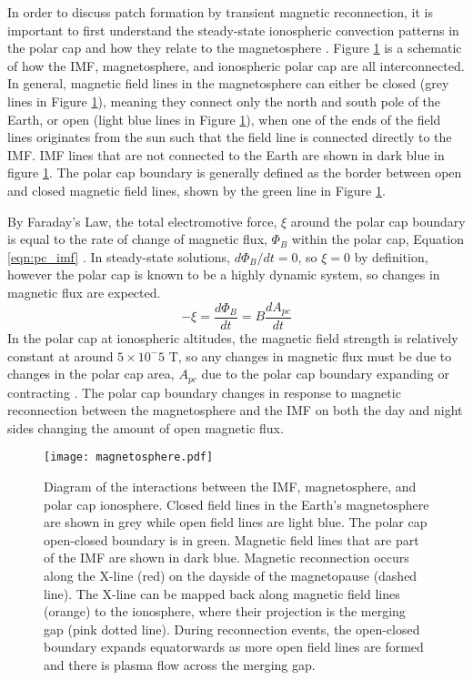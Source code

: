 In order to discuss patch formation by transient magnetic reconnection, it is important to first understand the steady-state ionospheric convection patterns in the polar cap and how they relate to the magnetosphere \citep{Cowley1980}.  Figure \ref{fig:magnetosphere} is a schematic of how the IMF, magnetosphere, and ionospheric polar cap are all interconnected.  In general, magnetic field lines in the magnetosphere can either be closed (grey lines in Figure \ref{fig:magnetosphere}), meaning they connect only the north and south pole of the Earth, or open (light blue lines in Figure \ref{fig:magnetosphere}), when one of the ends of the field lines originates from the sun such that the field line is connected directly to the IMF.  IMF lines that are not connected to the Earth are shown in dark blue in figure \ref{fig:magnetosphere}.  The polar cap boundary is generally defined as the border between open and closed magnetic field lines, shown by the green line in Figure \ref{fig:magnetosphere}.

By Faraday's Law, the total electromotive force, \(\xi\) around the polar cap boundary is equal to the rate of change of magnetic flux, \(\Phi_B\) within the polar cap, Equation \ref{eqn:pc_imf} \citep{Lockwood1992a}.  In steady-state solutions, \(d\Phi_B/dt = 0\), so \(\xi=0\) by definition, however the polar cap is known to be a highly dynamic system, so changes in magnetic flux are expected.
\begin{equation}
	\label{eqn:pc_imf}
	-\xi = \frac{d\Phi_B}{dt} = B\frac{dA_{pc}}{dt}
\end{equation}
In the polar cap at ionospheric altitudes, the magnetic field strength is relatively constant at around \(5\times 10^-5\) T, so any changes in magnetic flux must be due to changes in the polar cap area, \(A_{pc}\) due to the polar cap boundary expanding or contracting \citep{Lockwood1992a}.  The polar cap boundary changes in response to magnetic reconnection between the magnetosphere and the IMF  on both the day and night sides changing the amount of open magnetic flux.


\begin{figure}
	\texttt{[image: magnetosphere.pdf]}
	\caption{Diagram of the interactions between the IMF, magnetosphere, and polar cap ionosphere.  Closed field lines in the Earth's magnetosphere are shown in grey while open field lines are light blue.  The polar cap open-closed boundary is in green.  Magnetic field lines that are part of the IMF are shown in dark blue.  Magnetic reconnection occurs along the X-line (red) on the dayside of the magnetopause (dashed line).  The X-line can be mapped back along magnetic field lines (orange) to the ionosphere, where their projection is the merging gap (pink dotted line).  During reconnection events, the open-closed boundary expands equatorwards as more open field lines are formed and there is plasma flow across the merging gap.}
	\label{fig:magnetosphere}
\end{figure}

